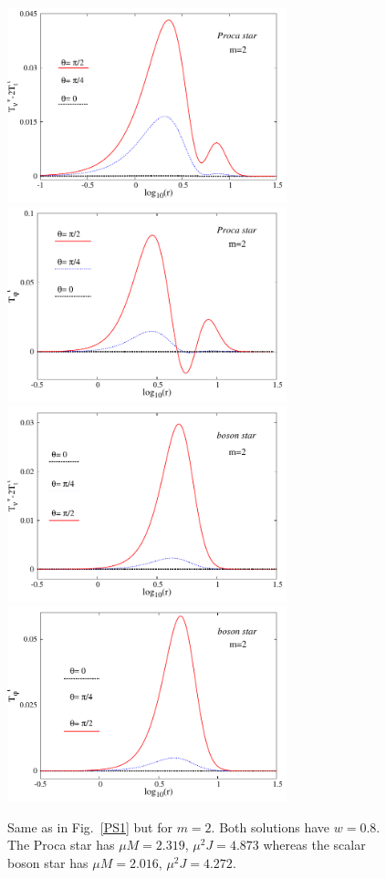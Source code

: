 \begin{figure}[h!]
  \begin{center}
    \includegraphics[width=8.1cm]{papers/Proca/PS-ro-m2.pdf}
    \includegraphics[width=8.1cm]{papers/Proca/PS-T34-m2.pdf}   
    \includegraphics[width=8.1cm]{papers/Proca/BS-ro-m2.pdf}
    \includegraphics[width=8.1cm]{papers/Proca/BS-T34-m2.pdf}
  \end{center}
 \caption{Same as in Fig.~\ref{PS1} but for $m=2$. Both solutions have $w=0.8$. The Proca star has $\mu M=2.319$, 
$\mu^2J=4.873$ whereas the scalar boson star has $\mu M=2.016$, $\mu^2J=4.272$.}
  \label{PS2}
\end{figure}


